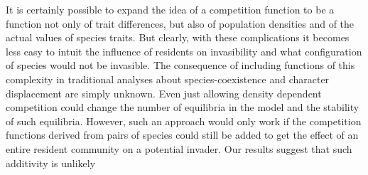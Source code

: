\documentclass[a4paper,11pt]{article}
\begin{document}
It is certainly possible to expand the idea of a competition function to be a function not only of trait differences, but also of population densities and of the actual values of species traits. But clearly, with these complications it becomes less easy to intuit the influence of residents on invasibility and what configuration of species would not be invasible. The consequence of including functions of this complexity in traditional analyses about species-coexistence and character displacement are simply unknown.
Even just allowing density dependent competition could change the number of equilibria in the model and the stability of such equilibria. However, such an approach would only work if the competition functions derived from pairs of species could still be added to get the effect of an entire resident community on a potential invader. Our results suggest that such additivity is unlikely
\end{document}
